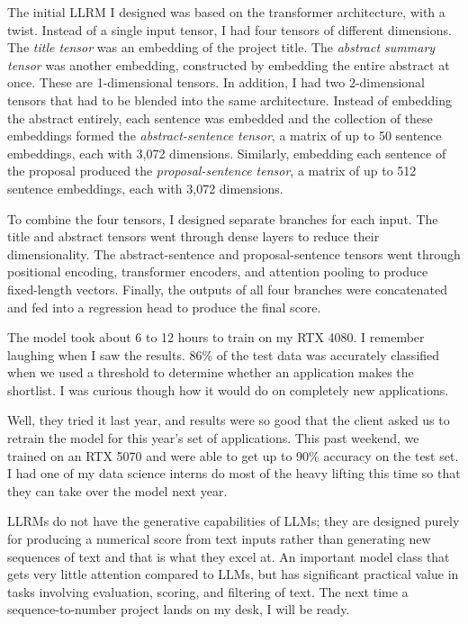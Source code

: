 \documentclass{news}
\begin{document}
The initial LLRM I designed was based on the transformer architecture, with a twist. Instead of a single input tensor, I had four tensors of different dimensions. The \emph{title tensor} was an embedding of the project title. The \emph{abstract summary tensor} was another embedding, constructed by embedding the entire abstract at once. These are 1-dimensional tensors. In addition, I had two 2-dimensional tensors that had to be blended into the same architecture. Instead of embedding the abstract entirely, each sentence was embedded and the collection of these embeddings formed the \emph{abstract-sentence tensor}, a matrix of up to 50 sentence embeddings, each with 3,072 dimensions. Similarly, embedding each sentence of the proposal produced the \emph{proposal-sentence tensor}, a matrix of up to 512 sentence embeddings, each with 3,072 dimensions.

To combine the four tensors, I designed separate branches for each input. The title and abstract tensors went through dense layers to reduce their dimensionality. The abstract-sentence and proposal-sentence tensors went through positional encoding, transformer encoders, and attention pooling to produce fixed-length vectors. Finally, the outputs of all four branches were concatenated and fed into a regression head to produce the final score.

The model took about 6 to 12 hours to train on my RTX 4080. I remember laughing when I saw the results. 86\% of the test data was accurately classified when we used a threshold to determine whether an application makes the shortlist. I was curious though how it would do on completely new applications.

Well, they tried it last year, and results were so good that the client asked us to retrain the model for this year's set of applications. This past weekend, we trained on an RTX 5070 and were able to get up to 90\% accuracy on the test set. I had one of my data science interns do most of the heavy lifting this time so that they can take over the model next year.

LLRMs do not have the generative capabilities of LLMs; they are designed purely for producing a numerical score from text inputs rather than generating new sequences of text and that is what they excel at. An important model class that gets very little attention compared to LLMs, but has significant practical value in tasks involving evaluation, scoring, and filtering of text. The next time a sequence-to-number project lands on my desk, I will be ready.
\end{document}
